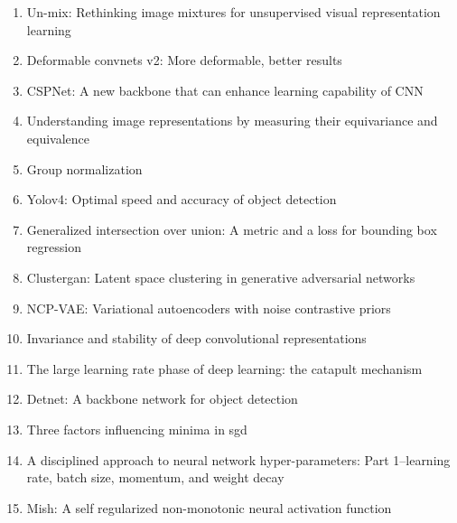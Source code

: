 \documentclass[acmlarge]{acmart}
\begin{document}
\begin{enumerate}
	\item Un-mix: Rethinking image mixtures for unsupervised visual representation learning \cite{shen2020mix} 

	\item Deformable convnets v2: More deformable, better results \cite{zhu2019deformable} 

	\item CSPNet: A new backbone that can enhance learning capability of CNN \cite{wang2020cspnet} 

	\item Understanding image representations by measuring their equivariance and equivalence \cite{lenc2015understanding} 

	\item Group normalization \cite{wu2018group} 

	\item Yolov4: Optimal speed and accuracy of object detection \cite{bochkovskiy2020yolov4} 

	\item Generalized intersection over union: A metric and a loss for bounding box regression \cite{rezatofighi2019generalized} 

	\item Clustergan: Latent space clustering in generative adversarial networks \cite{mukherjee2019clustergan} 

	\item NCP-VAE: Variational autoencoders with noise contrastive priors \cite{aneja2020ncp} 

	\item Invariance and stability of deep convolutional representations \cite{bietti2017invariance} 

	\item The large learning rate phase of deep learning: the catapult mechanism \cite{lewkowycz2020large} 

	\item Detnet: A backbone network for object detection \cite{li2018detnet} 

	\item Three factors influencing minima in sgd \cite{jastrzkebski2017three} 

	\item A disciplined approach to neural network hyper-parameters: Part 1--learning rate, batch size, momentum, and weight decay \cite{smith2018disciplined} 

	\item Mish: A self regularized non-monotonic neural activation function \cite{misra2019mish} 


\end{enumerate}
\end{document}
